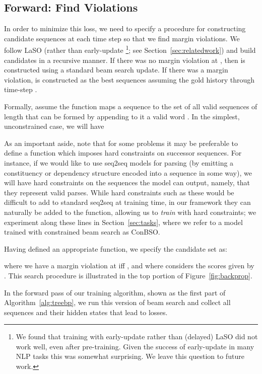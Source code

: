 \documentclass[11pt,letterpaper]{article}
\begin{document}
\subsection{Forward: Find Violations} 
\label{sec:forward}
In order to minimize this loss, we need to specify a procedure for
constructing candidate sequences  at each time step
 so that we find margin violations. We follow LaSO (rather than
early-update \footnote{We found that training with early-update rather than (delayed)
LaSO did not work well, even after pre-training. Given the success of early-update
in many NLP tasks this was somewhat surprising. We leave this question to future work.}; see Section~\ref{sec:relatedwork}) and build candidates
in a recursive manner. If there was no margin violation at ,
then  is constructed using a standard beam search update. If
there was a margin violation,  is constructed as the  best
sequences assuming the gold history  through time-step .



Formally, assume the
function  maps a sequence  to the
set of all valid sequences of length  that can be formed by appending to it a
valid word . In the
simplest, unconstrained case, we will have


As an important aside, note that for some problems it may be preferable to define a
 function which imposes hard constraints on successor sequences. For instance, if we would like to use seq2seq models for parsing (by emitting a constituency or dependency structure encoded into a sequence in some way), we will have hard constraints on the sequences the model can output, namely, that they represent valid parses. While hard constraints such as these would be difficult to add to standard seq2seq at training time, in our framework they can naturally be added to the  function, allowing us to \textit{train} with hard constraints; we experiment along these lines in Section~\ref{sec:tasks}, where we refer to a model trained with constrained beam search as ConBSO. 

Having defined an appropriate  function, we specify the candidate set as: 

where we have a margin violation at  iff , and where  considers the scores given by . This search procedure is illustrated in the top portion of Figure~\ref{fig:backprop}. 

In the forward pass of our training algorithm, shown as the first part of Algorithm~\ref{alg:treebp}, we run this version of
beam search and collect all sequences and their hidden states that
lead to losses. 
\end{document}
